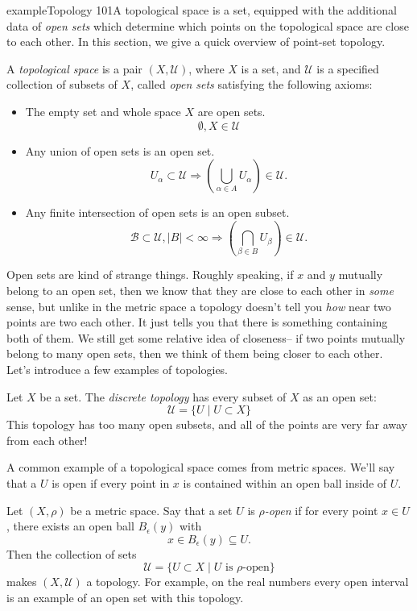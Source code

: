 
\begin{doubledpage}{example}{Topology 101}{A topological space is a set, equipped with the additional data of \emph{open sets} which determine which points on the topological space are close to each other. In this section, we give a quick overview of point-set topology. }
\label{def:topologycc}
\begin{definition}
    A \emph{topological space} is a pair $(X,\mathcal U)$, where $X$ is a set, and $\mathcal U$ is a specified collection of subsets of $X$, called \emph{open sets} satisfying the following axioms:
    \begin{itemize}
        \item The empty set and whole space $X$ are open sets. 
        \[\emptyset, X\in \mathcal U\]
        \item Any union of open sets is an open set. 
        \[U_\alpha \subset \mathcal U \Rightarrow \left(\bigcup_{\alpha \in A} U_\alpha \right) \in \mathcal U.\]
        \item Any finite intersection of open sets is an open subset. 
        \[\mathcal B\subset \mathcal U , | B|< \infty \Rightarrow \left(\bigcap_{\beta\in B} U_\beta \right) \in \mathcal U.\]
    \end{itemize}
    \end{definition}
    Open sets are kind of strange things. Roughly speaking, if $x$ and $y$ mutually belong to an open set, then we know that they are close to each other in \emph{some} sense, but unlike in the metric space a topology doesn't tell you \emph{how} near two points are two each other. It just tells you that there is something containing both of them. We still get some relative idea of closeness-- if two points mutually belong to many open sets, then we think of them being closer to each other. \\
    Let's introduce a few examples of topologies. 
    \begin{example}
    Let $X$ be a set. The \emph{discrete topology}  has every subset of $X$ as an open set:
    \[\mathcal U = \{U \;|\; U\subset X\}\]
    This topology has too many open subsets, and all of the points are very far away from each other!
    \end{example}
    A common example of a topological space comes from metric spaces.
    We'll say that a $U$ is open if every point in $x$ is contained within an open ball inside of $U$. 
\newpage
    \begin{example}
    Let $(X, \rho)$ be a metric space. Say that a set $U$ is \emph{$\rho$-open} if for every point $x\in U$, there exists an open ball $B_\epsilon(y)$ with 
    \[x\in B_\epsilon(y)\subseteq U.\]
    Then the collection of sets 
    \[\mathcal U = \{U\subset X \;|\; \text{$U$ is $\rho$-open}\}\]
    makes $(X, \mathcal U)$ a topology. For example, on the real numbers every open interval is an example of an open set with this topology. \label{thm:metrictopology} 
    \end{example}


\end{doubledpage}
